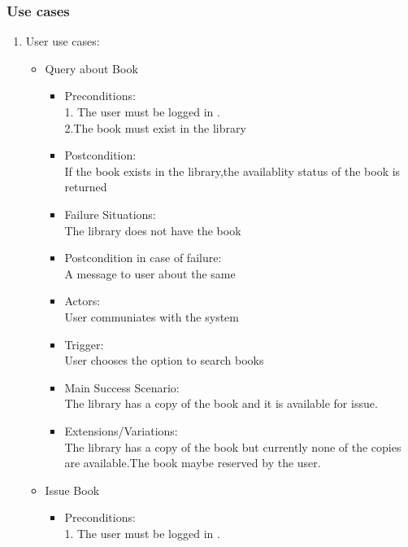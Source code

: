 \documentclass{article}
\begin{document}
\subsubsection*{Use cases}
\begin{enumerate}
\item User use cases:
	\begin{itemize}
	
	\item Query about Book\\
	\begin{itemize}
	\item Preconditions:\\
	1. The user must be logged in .\\
	2.The book must exist in the library\\
\item  Postcondition: \\If the book exists in the library,the availablity status of the book is returned\\
 \item Failure Situations:\\ The library does not have  the book \\
 \item Postcondition in case of failure:\\A message to user about the same\\
\item  Actors:\\ User communiates with the system\\
\item  Trigger:\\ User chooses the option to search books\\
 \item Main Success Scenario: \\The library has a copy of the book and it is available for issue.\\
\item  Extensions/Variations: \\The library has a copy of the book but currently none of the copies are available.The book maybe reserved by the user.
	\end{itemize}
 \item Issue Book\\
	\begin{itemize}
	 \item Preconditions:\\
	 1. The user must be logged in .\\

\end{itemize}
\end{itemize}
\end{enumerate}
\end{document}
